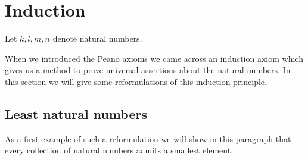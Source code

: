 \documentclass[../../arithmetic.tex]{subfiles}
\begin{document}
  \section{Induction}

  \begin{forthel}
  \end{forthel}

  \begin{forthel}
    Let $k, l, m, n$ denote natural numbers.
  \end{forthel}

  \noindent When we introduced the Peano axioms we came across an induction
  axiom which gives us a method to prove universal assertions about the natural
  numbers.
  In this section we will give some reformulations of this induction
  principle.


  \subsection{Least natural numbers}

  As a first example of such a reformulation we will show in this paragraph that
  every collection of natural numbers admits a smallest element.
\end{document}

